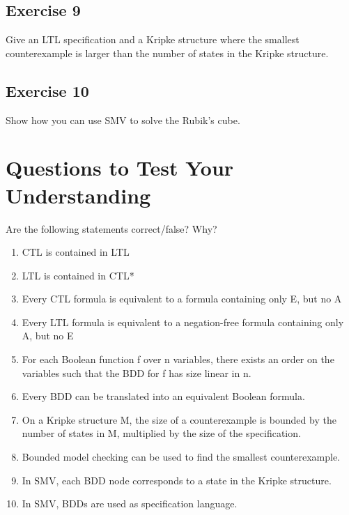 \documentclass[a4paper, 11pt]{article}
\begin{document}
\subsection{Exercise 9}

Give an LTL specification and a Kripke structure where the smallest counterexample is larger than the number of states in the Kripke structure.

\subsection{Exercise 10}

Show how you can use SMV to solve the Rubik’s cube.

\section{Questions to Test Your Understanding}

Are the following statements correct/false? Why?

\begin{enumerate}[label=(\alph*)]
    \item CTL is contained in LTL
    \item LTL is contained in CTL*
    \item Every CTL formula is equivalent to a formula containing only E, but no A
    \item Every LTL formula is equivalent to a negation-free formula containing only A, but no E
    \item For each Boolean function f over n variables, there exists an order on the variables such that the BDD for f has size linear in n.
    \item Every BDD can be translated into an equivalent Boolean formula.
    \item On a Kripke structure M, the size of a counterexample is bounded by the number of states in M, multiplied by the size of the specification.
    \item Bounded model checking can be used to find the smallest counterexample.
    \item In SMV, each BDD node corresponds to a state in the Kripke structure.
    \item In SMV, BDDs are used as specification language.
\end{enumerate}
\end{document}
